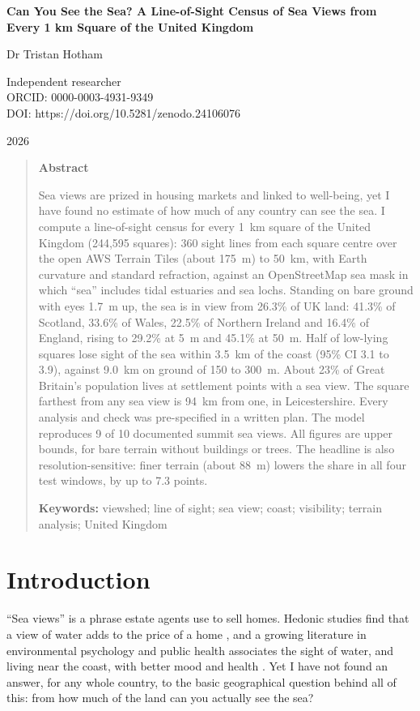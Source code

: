 \documentclass[11pt,a4paper]{article}
\begin{document}
\begin{center}
{\Large\bfseries Can You See the Sea? A Line-of-Sight Census of Sea Views from Every 1 km Square of the United Kingdom\par}
\vspace{1.2em}
{\large Dr Tristan Hotham\par}
\vspace{0.3em}
{\small Independent researcher\\
ORCID: 0000-0003-4931-9349\\
DOI: https://doi.org/10.5281/zenodo.24106076\par}
\vspace{0.8em}
2026
\end{center}

\begin{quote}
\small
\begin{center}\textbf{Abstract}\end{center}
Sea views are prized in housing markets and linked to well-being, yet I have found no estimate of how much of any country can see the sea. I compute a line-of-sight census for every 1~km square of the United Kingdom (244,595 squares): 360 sight lines from each square centre over the open AWS Terrain Tiles (about 175~m) to 50~km, with Earth curvature and standard refraction, against an OpenStreetMap sea mask in which ``sea'' includes tidal estuaries and sea lochs. Standing on bare ground with eyes 1.7~m up, the sea is in view from 26.3\% of UK land: 41.3\% of Scotland, 33.6\% of Wales, 22.5\% of Northern Ireland and 16.4\% of England, rising to 29.2\% at 5~m and 45.1\% at 50~m. Half of low-lying squares lose sight of the sea within 3.5~km of the coast (95\% CI 3.1 to 3.9), against 9.0~km on ground of 150 to 300~m. About 23\% of Great Britain's population lives at settlement points with a sea view. The square farthest from any sea view is 94~km from one, in Leicestershire. Every analysis and check was pre-specified in a written plan. The model reproduces 9 of 10 documented summit sea views. All figures are upper bounds, for bare terrain without buildings or trees. The headline is also resolution-sensitive: finer terrain (about 88~m) lowers the share in all four test windows, by up to 7.3 points.

\textbf{Keywords:} viewshed; line of sight; sea view; coast; visibility; terrain analysis; United Kingdom
\end{quote}

\section{Introduction}
``Sea views'' is a phrase estate agents use to sell homes. Hedonic studies find that a view of water adds to the price of a home \citep{benson1998,bourassa2004,jim2009}, and a growing literature in environmental psychology and public health associates the sight of water, and living near the coast, with better mood and health \citep{white2010,wheeler2012,nutsford2016,gascon2017}. Yet I have not found an answer, for any whole country, to the basic geographical question behind all of this: from how much of the land can you actually see the sea?
\end{document}
